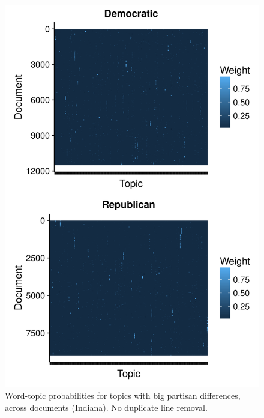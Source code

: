 \documentclass[11pt]{article}
\begin{document}
\begin{figure}[!ht]
	\centering %
	\caption{Word-topic probabilities for topics with big partisan differences, across documents (Indiana). No duplicate line removal.}
	\label{heatmaps_weights}
	\includegraphics[width=\linewidth]{figures/heatmaps_weights_noDuplicateRemoval_IN.png}
\end{figure}
\end{document}

